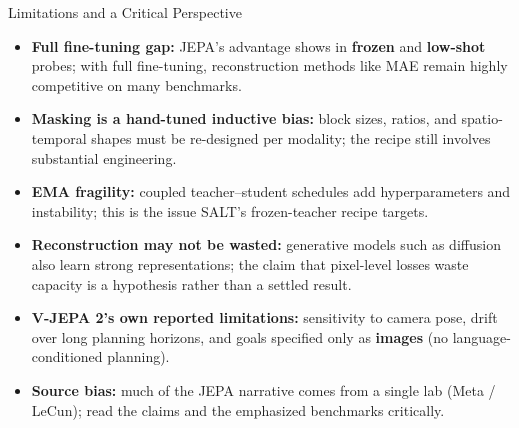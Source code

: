 \begin{frame}{Limitations and a Critical Perspective}
  \begin{itemize}\itemsep0.2em
    \item \textbf{Full fine-tuning gap:} JEPA's advantage shows in \textbf{frozen} and \textbf{low-shot} probes; with full fine-tuning, reconstruction methods like MAE remain highly competitive on many benchmarks.
    \item \textbf{Masking is a hand-tuned inductive bias:} block sizes, ratios, and spatio-temporal shapes must be re-designed per modality; the recipe still involves substantial engineering.
    \item \textbf{EMA fragility:} coupled teacher--student schedules add hyperparameters and instability; this is the issue SALT's frozen-teacher recipe targets.
    \item \textbf{Reconstruction may not be wasted:} generative models such as diffusion also learn strong representations; the claim that pixel-level losses waste capacity is a hypothesis rather than a settled result.
    \item \textbf{V-JEPA 2's own reported limitations:} sensitivity to camera pose, drift over long planning horizons, and goals specified only as \textbf{images} (no language-conditioned planning).
    \item \textbf{Source bias:} much of the JEPA narrative comes from a single lab (Meta / LeCun); read the claims and the emphasized benchmarks critically.
  \end{itemize}
\end{frame}
